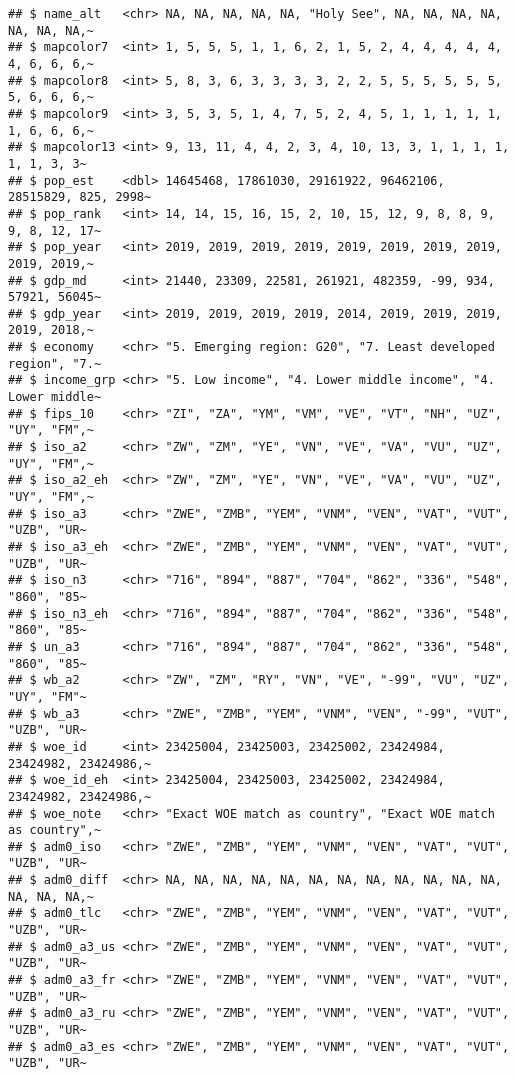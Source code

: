 \documentclass[
]{article}
\begin{document}
\begin{verbatim}
## $ name_alt   <chr> NA, NA, NA, NA, NA, "Holy See", NA, NA, NA, NA, NA, NA, NA,~
## $ mapcolor7  <int> 1, 5, 5, 5, 1, 1, 6, 2, 1, 5, 2, 4, 4, 4, 4, 4, 4, 6, 6, 6,~
## $ mapcolor8  <int> 5, 8, 3, 6, 3, 3, 3, 3, 2, 2, 5, 5, 5, 5, 5, 5, 5, 6, 6, 6,~
## $ mapcolor9  <int> 3, 5, 3, 5, 1, 4, 7, 5, 2, 4, 5, 1, 1, 1, 1, 1, 1, 6, 6, 6,~
## $ mapcolor13 <int> 9, 13, 11, 4, 4, 2, 3, 4, 10, 13, 3, 1, 1, 1, 1, 1, 1, 3, 3~
## $ pop_est    <dbl> 14645468, 17861030, 29161922, 96462106, 28515829, 825, 2998~
## $ pop_rank   <int> 14, 14, 15, 16, 15, 2, 10, 15, 12, 9, 8, 8, 9, 9, 8, 12, 17~
## $ pop_year   <int> 2019, 2019, 2019, 2019, 2019, 2019, 2019, 2019, 2019, 2019,~
## $ gdp_md     <int> 21440, 23309, 22581, 261921, 482359, -99, 934, 57921, 56045~
## $ gdp_year   <int> 2019, 2019, 2019, 2019, 2014, 2019, 2019, 2019, 2019, 2018,~
## $ economy    <chr> "5. Emerging region: G20", "7. Least developed region", "7.~
## $ income_grp <chr> "5. Low income", "4. Lower middle income", "4. Lower middle~
## $ fips_10    <chr> "ZI", "ZA", "YM", "VM", "VE", "VT", "NH", "UZ", "UY", "FM",~
## $ iso_a2     <chr> "ZW", "ZM", "YE", "VN", "VE", "VA", "VU", "UZ", "UY", "FM",~
## $ iso_a2_eh  <chr> "ZW", "ZM", "YE", "VN", "VE", "VA", "VU", "UZ", "UY", "FM",~
## $ iso_a3     <chr> "ZWE", "ZMB", "YEM", "VNM", "VEN", "VAT", "VUT", "UZB", "UR~
## $ iso_a3_eh  <chr> "ZWE", "ZMB", "YEM", "VNM", "VEN", "VAT", "VUT", "UZB", "UR~
## $ iso_n3     <chr> "716", "894", "887", "704", "862", "336", "548", "860", "85~
## $ iso_n3_eh  <chr> "716", "894", "887", "704", "862", "336", "548", "860", "85~
## $ un_a3      <chr> "716", "894", "887", "704", "862", "336", "548", "860", "85~
## $ wb_a2      <chr> "ZW", "ZM", "RY", "VN", "VE", "-99", "VU", "UZ", "UY", "FM"~
## $ wb_a3      <chr> "ZWE", "ZMB", "YEM", "VNM", "VEN", "-99", "VUT", "UZB", "UR~
## $ woe_id     <int> 23425004, 23425003, 23425002, 23424984, 23424982, 23424986,~
## $ woe_id_eh  <int> 23425004, 23425003, 23425002, 23424984, 23424982, 23424986,~
## $ woe_note   <chr> "Exact WOE match as country", "Exact WOE match as country",~
## $ adm0_iso   <chr> "ZWE", "ZMB", "YEM", "VNM", "VEN", "VAT", "VUT", "UZB", "UR~
## $ adm0_diff  <chr> NA, NA, NA, NA, NA, NA, NA, NA, NA, NA, NA, NA, NA, NA, NA,~
## $ adm0_tlc   <chr> "ZWE", "ZMB", "YEM", "VNM", "VEN", "VAT", "VUT", "UZB", "UR~
## $ adm0_a3_us <chr> "ZWE", "ZMB", "YEM", "VNM", "VEN", "VAT", "VUT", "UZB", "UR~
## $ adm0_a3_fr <chr> "ZWE", "ZMB", "YEM", "VNM", "VEN", "VAT", "VUT", "UZB", "UR~
## $ adm0_a3_ru <chr> "ZWE", "ZMB", "YEM", "VNM", "VEN", "VAT", "VUT", "UZB", "UR~
## $ adm0_a3_es <chr> "ZWE", "ZMB", "YEM", "VNM", "VEN", "VAT", "VUT", "UZB", "UR~

\end{verbatim}
\end{document}

